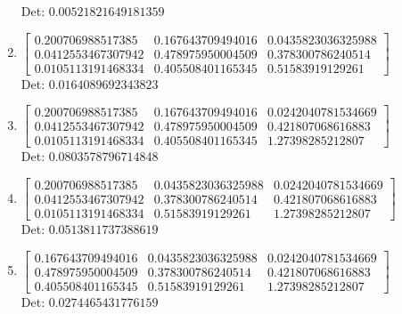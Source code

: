 \documentclass[12pt]{article}
\begin{document}
\begin{enumerate}
Det: $0.00521821649181359$\\

\item $\displaystyle \left[\begin{matrix}0.200706988517385 & 0.167643709494016 & 0.0435823036325988\\0.0412553467307942 & 0.478975950004509 & 0.378300786240514\\0.0105113191468334 & 0.405508401165345 & 0.51583919129261\end{matrix}\right]$\\

Det: $0.0164089692343823$\\

\item $\displaystyle \left[\begin{matrix}0.200706988517385 & 0.167643709494016 & 0.0242040781534669\\0.0412553467307942 & 0.478975950004509 & 0.421807068616883\\0.0105113191468334 & 0.405508401165345 & 1.27398285212807\end{matrix}\right]$\\

Det: $0.0803578796714848$\\

\item $\displaystyle \left[\begin{matrix}0.200706988517385 & 0.0435823036325988 & 0.0242040781534669\\0.0412553467307942 & 0.378300786240514 & 0.421807068616883\\0.0105113191468334 & 0.51583919129261 & 1.27398285212807\end{matrix}\right]$\\

Det: $0.0513811737388619$\\

\item $\displaystyle \left[\begin{matrix}0.167643709494016 & 0.0435823036325988 & 0.0242040781534669\\0.478975950004509 & 0.378300786240514 & 0.421807068616883\\0.405508401165345 & 0.51583919129261 & 1.27398285212807\end{matrix}\right]$\\

Det: $0.0274465431776159$\\


\end{enumerate}
\end{document}
